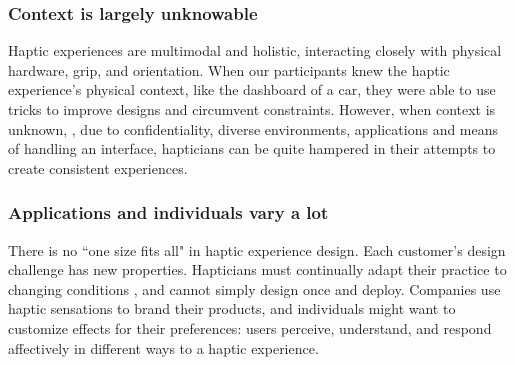     \subsubsection{Context is largely unknowable}
    \noindent
    Haptic experiences are multimodal and holistic, %
     interacting closely with physical hardware, grip, and orientation.
    When our participants knew the haptic experience's physical context, like the dashboard of a car,
   they were able to use tricks to improve designs and circumvent constraints. %
    However, when context is unknown, \eg, due to confidentiality, %
    diverse environments, applications and means of handling an interface, %
    hapticians can be quite hampered in their attempts %
    to create consistent experiences.
    
    \subsubsection{Applications and individuals vary a lot}
    \noindent
    There is no ``one size fits all" in haptic experience design.
    Each customer's design challenge has new properties.
    Hapticians must continually adapt their practice to changing conditions \citep{Schon1982}, and cannot simply design once and deploy.
    Companies use haptic sensations to brand their products, and individuals might want to customize effects for their preferences:
    users perceive, understand, and respond affectively in different ways to a haptic experience.
    
